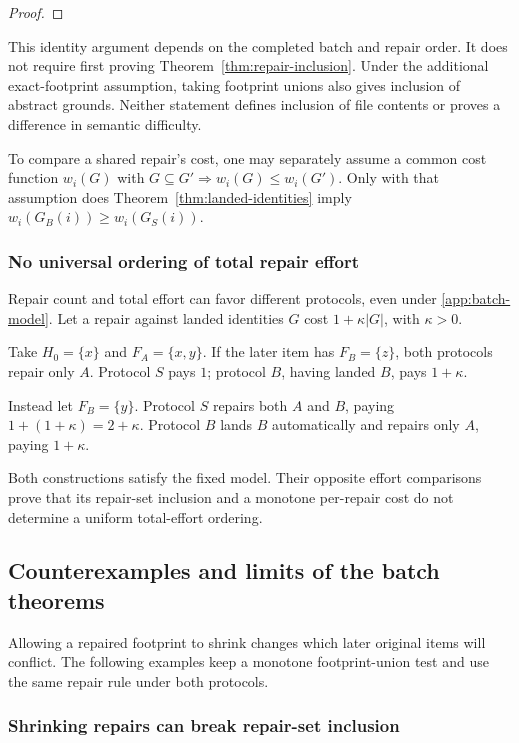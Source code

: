 \documentclass[pdflatex,sn-mathphys-ay]{sn-jnl}
\theoremstyle{thmstyleone}
\theoremstyle{thmstylethree}
\begin{document}
\begin{appendices}
\begin{proof}
\end{proof}

This identity argument depends on the completed batch and repair order. It does not require first proving Theorem~\ref{thm:repair-inclusion}. Under the additional exact-footprint assumption, taking footprint unions also gives inclusion of abstract grounds. Neither statement defines inclusion of file contents or proves a difference in semantic difficulty.

To compare a shared repair's cost, one may separately assume a common cost function \(w_i(G)\) with \(G\subseteq G'\Rightarrow w_i(G)\le w_i(G')\). Only with that assumption does Theorem~\ref{thm:landed-identities} imply \(w_i(G_B(i))\ge w_i(G_S(i))\).

\subsubsection{No universal ordering of total repair effort}\label{app:total-effort}

Repair count and total effort can favor different protocols, even under \ref{app:batch-model}. Let a repair against landed identities \(G\) cost \(1+\kappa|G|\), with \(\kappa>0\).

Take \(H_0=\{x\}\) and \(F_A=\{x,y\}\). If the later item has \(F_B=\{z\}\), both protocols repair only \(A\). Protocol \(S\) pays \(1\); protocol \(B\), having landed \(B\), pays \(1+\kappa\).

Instead let \(F_B=\{y\}\). Protocol \(S\) repairs both \(A\) and \(B\), paying \(1+(1+\kappa)=2+\kappa\). Protocol \(B\) lands \(B\) automatically and repairs only \(A\), paying \(1+\kappa\).

Both constructions satisfy the fixed model. Their opposite effort comparisons prove that its repair-set inclusion and a monotone per-repair cost do not determine a uniform total-effort ordering.

\subsection{Counterexamples and limits of the batch theorems}\label{app:counterexamples}

Allowing a repaired footprint to shrink changes which later original items will conflict. The following examples keep a monotone footprint-union test and use the same repair rule under both protocols.

\subsubsection{Shrinking repairs can break repair-set inclusion}\label{app:shrinking-inclusion}


\end{appendices}
\end{document}
